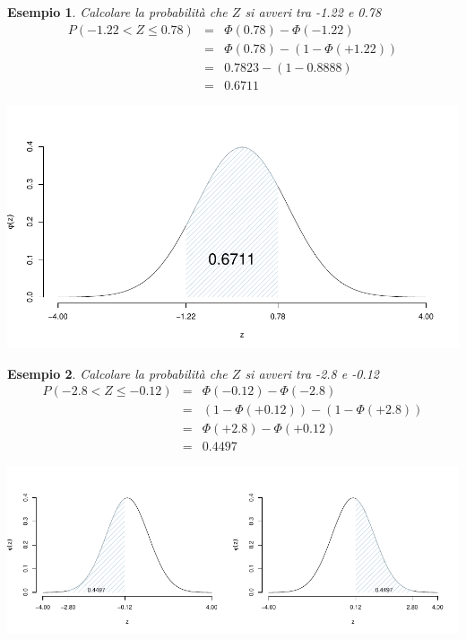 \documentclass[
  11pt,
]{book}
\theoremstyle{mytheoremstyle}
\theoremstyle{mydefstyle}
\newtheorem{example}{{Esempio}}[section]
\begin{document}
\begin{example}

Calcolare la probabilità che \(Z\) si avveri tra -1.22 e 0.78
\begin{eqnarray*}
P(-1.22< Z \leq 0.78) &=& \Phi(0.78)-\Phi(-1.22) \\
                         &=& \Phi(0.78)-(1-\Phi(+1.22)) \\
                         &=& 0.7823-(1-0.8888)\\
                         &=& 0.6711
\end{eqnarray*}

\begin{center}\includegraphics{Appunti_di_Statistica_2025_files/figure-latex/07c-Normale-23,-1} \end{center}

\end{example}

\begin{example}

Calcolare la probabilità che \(Z\) si avveri tra -2.8 e -0.12
\begin{eqnarray*}
P(-2.8< Z \leq -0.12) &=& \Phi(-0.12)-\Phi(-2.8) \\
                         &=& (1-\Phi(+0.12))-(1-\Phi(+2.8)) \\
                         &=& \Phi(+2.8)-\Phi(+0.12)\\
                         &=& 0.4497
\end{eqnarray*}

\begin{center}\includegraphics{Appunti_di_Statistica_2025_files/figure-latex/07c-Normale-25,-1} \end{center}

\end{example}
\end{document}
